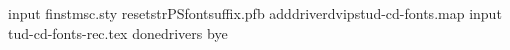input finstmsc.sty
resetstr{PSfontsuffix}{.pfb}
adddriver{dvips}{tud-cd-fonts.map}
input tud-cd-fonts-rec.tex
donedrivers
bye
